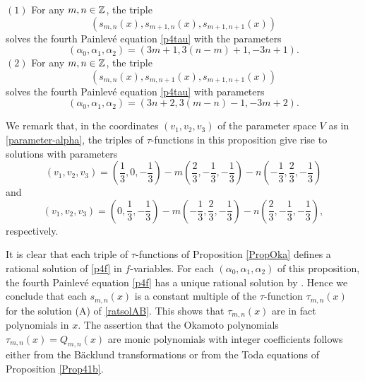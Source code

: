 \begin{prop}\label{PropOka}
$(1)$  For any $m,n\in{\Bbb Z}$, the triple 
\begin{equation}
(s_{m,n}(x), s_{m+1,n}(x), s_{m+1,n+1}(x))
\end{equation}
solves the fourth Painlev\'e equation \eqref{p4tau} with the 
parameters 
\begin{equation}
(\alpha_0,\alpha_1,\alpha_2)=(3m+1,3(n-m)+1,-3 n+1).
\end{equation}
$(2)$  For any $m,n\in{\Bbb Z}$, the triple 
\begin{equation}
(s_{m,n}(x), s_{m,n+1}(x), s_{m+1,n+1}(x))
\end{equation}
solves the fourth Painlev\'e equation \eqref{p4tau} with 
parameters 
\begin{equation}
(\alpha_0,\alpha_1,\alpha_2)=(3n+2,3(m-n)-1,-3 m+2).
\end{equation}
\end{prop}
\medskip\noindent
We remark that, in the coordinates $(v_1,v_2,v_3)$ of the 
parameter space $V$ as in \eqref{parameter-alpha}, the triples of 
$\tau$-functions in this proposition give rise to 
solutions with parameters 
\begin{equation}
(v_1,v_2,v_3)=(\frac{1}{3},0,-\frac{1}{3})
-m(\frac{2}{3},-\frac{1}{3},-\frac{1}{3})
-n(-\frac{1}{3},\frac{2}{3},-\frac{1}{3})
\end{equation}
and
\begin{equation}
(v_1,v_2,v_3)=(0,\frac{1}{3},-\frac{1}{3})
-m(-\frac{1}{3},\frac{2}{3},-\frac{1}{3})
-n(\frac{2}{3},-\frac{1}{3},-\frac{1}{3}),
\end{equation}
respectively. 

It is clear that each triple of $\tau$-functions of Proposition 
\ref{PropOka}
defines a rational solution of \eqref{p4f} in $f$-variables.  
For each $(\alpha_0,\alpha_1,\alpha_2)$ of this proposition, 
the fourth Painlev\'e equation \eqref{p4f} has 
a unique rational solution by \cite{M}.  
Hence we conclude that each $s_{m,n}(x)$ is a constant 
multiple of the $\tau$-function $\tau_{m,n}(x)$ 
for the solution (A) of \eqref{ratsolAB}. 
This shows that $\tau_{m,n}(x)$ are in fact polynomials 
in $x$.   
The assertion that the Okamoto polynomials 
$\tau_{m,n}(x)=Q_{m,n}(x)$ are monic polynomials with 
integer coefficients follows 
either from the B\"acklund transformations
or from the Toda equations of Proposition \ref{Prop41b}. 

